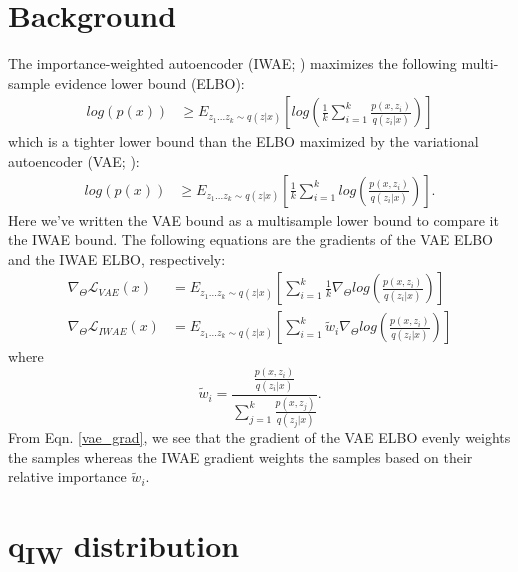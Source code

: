 \documentclass{article} %
\newcommand{\eqname}[1]{\tag*{#1}}
\begin{document}
\section{Background}
The importance-weighted autoencoder (IWAE; \cite{burda2015importance}) maximizes the following multi-sample evidence lower bound (ELBO): 
\begin{align} 
    log(p(x)) &
    \geq E_{z_{1}...z_{k} \sim q(z|x)} \left[log\left(  \frac{1}{k}\sum_{i=1}^k \frac{p(x,z_i)}{q(z_i|x)}  \right)  \right] \label{iwae_elbo}  \eqname{(IWAE ELBO)}
\end{align}
which is a tighter lower bound than the ELBO maximized by the variational autoencoder (VAE; \cite{vae}):
\begin{align}
    log(p(x)) & \geq E_{z_{1}...z_{k} \sim q(z|x)} \left[  \frac{1}{k}\sum_{i=1}^k log\left(\frac{p(x,z_i)}{q(z_i|x)}  \right)  \right]. \label{vae_elbo} \eqname{(VAE ELBO)}
\end{align}
Here we've written the VAE bound as a multisample lower bound to compare it the IWAE bound. The following equations are the gradients of the VAE ELBO and the IWAE ELBO, respectively:
\begin{align} 
    \nabla_{\Theta} \mathcal{L}_{VAE}(x) &= E_{z_{1}...z_{k} \sim q(z|x)} \left[   \sum_{i=1}^k \frac{1}{k} \nabla_{\Theta} log\left(\frac{p(x,z_i)}{q(z_i|x)}  \right)  \right] \label{vae_grad} \\
    \nabla_{\Theta} \mathcal{L}_{IWAE}(x) &= E_{z_{1}...z_{k} \sim q(z|x)} \left[  \sum_{i=1}^k \tilde{w}_i \nabla_{\Theta} log\left(\frac{p(x,z_i)}{q(z_i|x)}  \right)  \right] \label{iwae_grad}
\end{align}
where $$\tilde{w}_i = \frac{\frac{p(x,z_i)}{q(z_i|x)}}{\sum_{j=1}^k \frac{p(x,z_j)}{q(z_j|x)}}.$$
From Eqn. \ref{vae_grad}, we see that the gradient of the VAE ELBO evenly weights the samples whereas the IWAE gradient weights the samples based on their relative importance $\tilde{w}_i$.




\section{q\textsubscript{IW} distribution}
\end{document}
